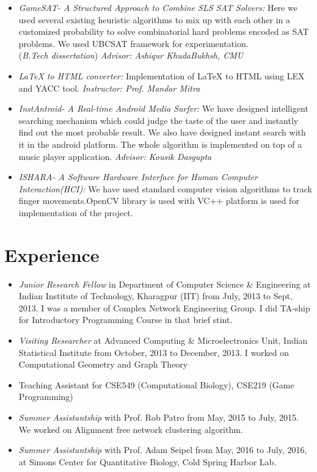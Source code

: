 \documentclass{res}
\begin{document}
\begin{resume}
\begin{itemize}
 \item 
 {{\it GameSAT- A Structured Approach to Combine SLS SAT Solvers:}} Here we used several existing heuristic algorithms to mix up with each other in a customized probability to solve combinatorial hard problems encoded as SAT problems. We used UBCSAT framework for experimentation. \\
({\it B.Tech dissertation}) {\it Advisor: Ashiqur KhudaBukhsh, CMU}

\item{{\it \LaTeX\xspace to HTML converter:}} Implementation of \LaTeX\xspace to  HTML using LEX and YACC tool. {\it Instructor: Prof. Mandar Mitra}

\item {{\it InstAntroid- A Real-time Android Media Surfer:}} We have designed intelligent searching
  mechanism which could judge the taste of the user and instantly find out the most probable
  result. We also have designed instant search with it in the android platform. The whole
  algorithm is implemented on top of a music player application.
 {\it Advisor: Kousik Dasgupta}
 
 \item {{\it ISHARA- A Software Hardware Interface for Human Computer Interaction(HCI):}} We have used standard computer vision algorithms to track finger movements.OpenCV library is used with VC++ platform is used for implementation of the project.
 
 \end{itemize}
 
            
\section{Experience}
\begin{itemize}
\item {\it Junior Research Fellow} in Department of Computer Science \& Engineering at Indian Institute of Technology, Kharagpur (IIT) 
from July, 2013 to Sept, 2013. I was a member of Complex Network Engineering Group. I did TA-ship for Introductory Programming 
Course in that brief stint. 
\item {\it Visiting Researcher} at Advanced Computing \& Microelectronics Unit, Indian Statistical Institute from October, 2013 to December, 
2013. I worked on Computational Geometry and Graph Theory
\item  Teaching Assistant for CSE549 (Computational Biology), CSE219 (Game Programming)
\item {\it Summer Assistantship} with Prof. Rob Patro from May, 2015 to July, 2015. We worked on Alignment free network clustering algorithm. 
\item {\it Summer Assistantship} with Prof. Adam Seipel from May, 2016 to July, 2016, at Simons Center for Quantitative Biology, Cold Spring Harbor Lab. 
\end{itemize}


\end{resume}
\end{document}
